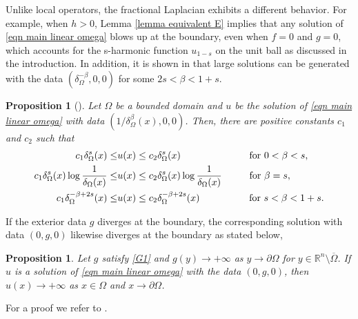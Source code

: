 \documentclass{amsart}
\newtheorem{proposition}[theorem]{Proposition}
\newcommand{\R}{\mathbb{R}}
\newcommand{\slap}{(-\Delta)^{s}}
\newcommand{\rn}{\mathbb{R}^{n}}
\begin{document}
 Unlike local operators, the fractional Laplacian exhibits a different behavior. For example, when $h>0$, Lemma \ref{lemma equivalent E} implies that any solution of \eqref{eqn main linear omega} blows up at the boundary, even when $f=0$ and $g=0$, which accounts for the s-harmonic function $u_{1-s}$ on the unit ball as discussed in the introduction. In addition, it is shown in \cite{AbatangeloVazquez2023, Abaratgelo2017} that large solutions can be generated with the data $(\delta^{-\beta}_{\Omega},0,0)$ for some $2s<\beta<1+s$.
 \begin{proposition}[{\cite[Theorem 3.4]{AbatangeloVazquez2023}}]\label{prop boundary behaviour of the solution on bounded domain}
     Let $\Omega$ be a bounded domain and $u$ be the solution of \eqref{eqn main linear omega} with data $(1/\delta_{\Omega}^{\beta}(x), 0,0)$. 
     Then, there are positive constants $c_{1}$ and $c_{2}$ such that 
     \begin{equation*}
         \begin{split}
             c_{1}\delta_{\Omega}^{s}(x)\leq &u(x)\leq c_{2}\delta_{\Omega}^{s}(x) \hspace{2.5cm} \text{for }0<\beta<s,\\
             c_{1}\delta_{\Omega}^{s}(x)\log \frac{1}{\delta_{\Omega}(x)}\leq &u(x)\leq c_{2}\delta_{\Omega}^{s}(x)\log \frac{1}{\delta_{\Omega}(x)}\hspace{1cm} \text{for } \beta=s,\\
             c_{1}\delta_{\Omega}^{-\beta+2s}(x)\leq &u(x)\leq c_{2}\delta_{\Omega}^{-\beta+2s}(x) \hspace{1.8cm}\text{for } s<\beta<1+s.
         \end{split}
     \end{equation*}
\end{proposition}
 If the exterior data $g$ diverges at the boundary, the corresponding solution with data $(0, g, 0)$ likewise diverges at the boundary as stated below,
\begin{proposition}\cite{Abatangelo2015LargesHarmonic}
    Let $g$ satisfy \ref{G1} and $g(y)\to +\infty$ as $y\to \partial\Omega$ for $y\in \rn\setminus\overline{\Omega}$. If $u$ is a solution of \eqref{eqn main linear omega} with the data $(0,g,0)$, then $u(x)\to +\infty$ as $x\in \Omega$ and $x\to \partial\Omega$.
\end{proposition}
 For a proof we refer to \cite[Remark 3 and subsection 3.6.2]{Abatangelo2015LargesHarmonic}.
\end{document}
